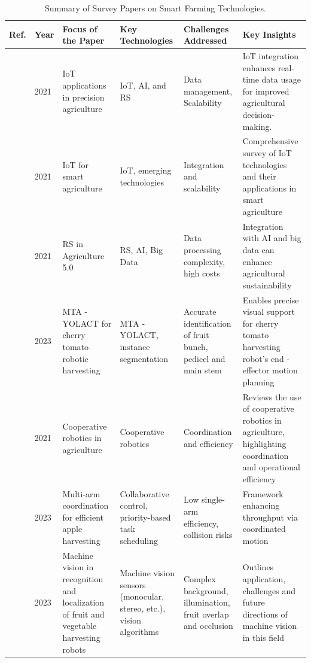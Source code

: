 \documentclass[a4paper,fleqn]{cas-dc}
\begin{document}
\begin{table}[ht]
\scriptsize
\centering
\caption{Summary of Survey Papers on Smart Farming Technologies.} 
\label{tab:survey_summary}
\begin{tabular} {p{0.4cm}p{0.5cm}p{3cm}p{3.2cm}p{3cm}p{4.5cm}}
\toprule
\textbf{Ref.} & \textbf{Year} & \textbf{Focus of the Paper} & \textbf{Key Technologies} & \textbf{Challenges Addressed} & \textbf{Key Insights} \\ \midrule

\cite{mohamed2021smart} & 2021 & IoT applications in precision agriculture & IoT, AI, and RS & Data management, Scalability & IoT integration enhances real-time data usage for improved agricultural decision-making. \\ \midrule
\cite{friha2021internet} & 2021 & IoT for smart agriculture & IoT, emerging technologies & Integration and scalability & Comprehensive survey of IoT technologies and their applications in smart agriculture \\ \midrule
\cite{martos2021ensuring} & 2021 & RS in Agriculture 5.0 & RS, AI, Big Data & Data processing complexity, high costs & Integration with AI and big data can enhance agricultural sustainability \\ \midrule
\cite{li2023mta} & 2023 & MTA - YOLACT for cherry tomato robotic harvesting & MTA - YOLACT, instance segmentation & Accurate identification of fruit bunch, pedicel and main stem & Enables precise visual support for cherry tomato harvesting robot's end - effector motion planning \\ \midrule
\cite{lytridis2021overview} & 2021 & Cooperative robotics in agriculture & Cooperative robotics & Coordination and efficiency & Reviews the use of cooperative robotics in agriculture, highlighting coordination and operational efficiency \\ \midrule
\cite{li2023multi}  & 2023 & Multi-arm coordination for efficient apple harvesting & Collaborative control, priority-based task scheduling & Low single-arm efficiency, collision risks & Framework enhancing throughput via coordinated motion \\ \midrule
\cite{hou2023overview} & 2023 & Machine vision in recognition and localization of fruit and vegetable harvesting robots & Machine vision sensors (monocular, stereo, etc.), vision algorithms & Complex background, illumination, fruit overlap and occlusion & Outlines application, challenges and future directions of machine vision in this field \\ \midrule

\end{tabular}
\end{table}
\end{document}
